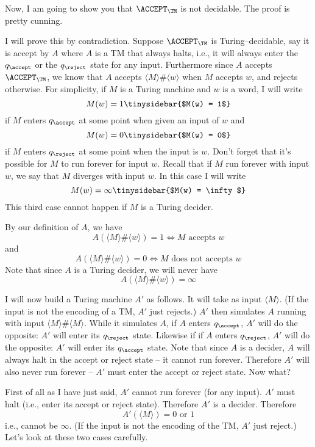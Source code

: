 Now, I am going to show you that $\ACCEPT_\TM$ is not 
decidable.
The proof is pretty cunning.

I will prove this by contradiction.
Suppose
$\ACCEPT_\TM$
is Turing--decidable, say it is accept by $A$
where $A$ is a TM that always halts, i.e., it will always enter the
$q_\accept$ or the $q_\reject$ state for any input.
Furthermore since $A$ accepts $\ACCEPT_\TM$, we know that 
$A$ accepts $\langle M  \rangle \#\langle w \rangle$
when $M$ accepts $w$, and rejects otherwise.
For simplicity, if $M$ is a Turing machine and $w$ is a word,
I will write
\[
M(w) = 1 \tinysidebar{$M(w) = 1$}\index{m@$M(w) = 1$}
\]
if $M$ enters $q_\accept$ at some point when given an input of $w$
and 
\[
M(w) = 0 \tinysidebar{$M(w) = 0$}\index{m@$M(w) = 0$}
\]
if $M$ enters $q_\reject$ at some point when the input is $w$.
Don't forget that it's possible for $M$ to run forever
for input $w$.
Recall that if $M$ run forever with input $w$, we say
that $M$ diverges with input $w$.
In this case I will write
\[
M(w) = \infty \tinysidebar{$M(w) = \infty$}\index{m@$M(w) = \infty$}
\]
This third case cannot happen if $M$ is a Turing decider.

By our definition of $A$, 
we have
\[
A(\langle M \rangle \# \langle w\rangle) = 1
\iff M \text{ accepts } w
\]
and 
\[
A(\langle M \rangle \# \langle w\rangle) = 0
\iff M \text{ does not accepts } w
\]
Note that since $A$ is a Turing decider, we will never have
\[
A(\langle M \rangle \# \langle w\rangle) = \infty
\]

I will now build a Turing machine $A'$ as follows.
It will take as input 
$\langle M \rangle$.
(If the input is not the encoding of a TM, $A'$ just rejects.)
$A'$ then simulates $A$ running with input $\langle M \rangle \# \langle M \rangle$.
While it simulates $A$, if $A$ enters $q_\accept$, 
$A'$ will do the opposite: 
$A'$ will enter its $q_\reject$ state.
Likewise if 
if $A$ enters $q_\reject$, 
$A'$ will do the opposite: $A'$ 
will enter its $q_\accept$ state.
Note that since $A$ is a decider, $A$ will always halt in the
accept or reject state -- it cannot run forever.
Therefore $A'$ will also never run forever -- $A'$ must
enter the accept or reject state.
Now what?


First of all as I have just said, $A'$ cannot run forever (for any input).
$A'$ must halt (i.e., enter its accept or reject state).
Therefore $A'$ is a decider.
Therefore
\[
A'(\langle M \rangle) = 0 \text{ or } 1
\]
i.e., cannot be $\infty$.
(If the input is not the encoding of the TM, $A'$ just reject.)
Let's look at these two cases carefully.

